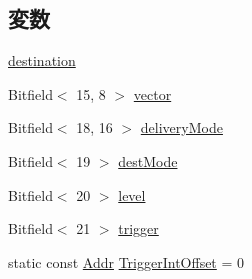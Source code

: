 \subsection*{変数}
\begin{DoxyCompactItemize}
\item 
\hyperlink{namespaceX86ISA_a78018be0196ca47c5ce84ad62a0d4dba}{destination}
\item 
Bitfield$<$ 15, 8 $>$ \hyperlink{namespaceX86ISA_a7ea82552101f041fad7635b3ed036a84}{vector}
\item 
Bitfield$<$ 18, 16 $>$ \hyperlink{namespaceX86ISA_a34b0ef8281faabd4b541199a582a889d}{deliveryMode}
\item 
Bitfield$<$ 19 $>$ \hyperlink{namespaceX86ISA_a22d205987d2a9bb2d06283f2cb5b1b22}{destMode}
\item 
Bitfield$<$ 20 $>$ \hyperlink{namespaceX86ISA_a66adbc3470a30c6702194c0e48f2225d}{level}
\item 
Bitfield$<$ 21 $>$ \hyperlink{namespaceX86ISA_a23ab51ec25f2500855e38a8fb465e451}{trigger}
\item 
static const \hyperlink{base_2types_8hh_af1bb03d6a4ee096394a6749f0a169232}{Addr} \hyperlink{namespaceX86ISA_af066cba0bd7ddf4112536139f15c0804}{TriggerIntOffset} = 0
\end{DoxyCompactItemize}
